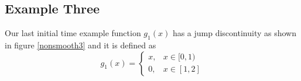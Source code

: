 \documentclass[00main.tex]{subfiles}
\begin{document}
%
%
%
%


\subsection{Example Three}


Our last initial time example function $g_1(x)$ has a jump discontinuity as shown in figure \eqref{nonsmooth3} and it is defined as \begin{equation}
g_1(x) = \left\lbrace \begin{array}{ll}
x, & x\in [0,1) \\
0, & x \in [1, 2]
\end{array} \right.
\end{equation}
\end{document}

